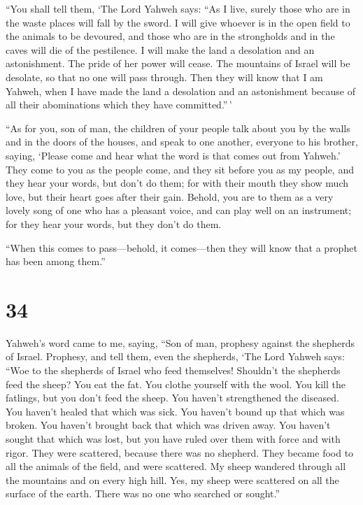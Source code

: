  ``You shall tell them, `The Lord Yahweh says: ``As I live,
surely those who are in the waste places will fall by the sword. I will
give whoever is in the open field to the animals to be devoured, and
those who are in the strongholds and in the caves will die of the
pestilence.  I will make the land a desolation and an
astonishment. The pride of her power will cease. The mountains of Israel
will be desolate, so that no one will pass through.  Then
they will know that I am Yahweh, when I have made the land a desolation
and an astonishment because of all their abominations which they have
committed.''\,'

 ``As for you, son of man, the children of your people talk
about you by the walls and in the doors of the houses, and speak to one
another, everyone to his brother, saying, `Please come and hear what the
word is that comes out from Yahweh.'  They come to you as
the people come, and they sit before you as my people, and they hear
your words, but don't do them; for with their mouth they show much love,
but their heart goes after their gain.  Behold, you are to
them as a very lovely song of one who has a pleasant voice, and can play
well on an instrument; for they hear your words, but they don't do them.

 ``When this comes to pass---behold, it comes---then they
will know that a prophet has been among them.''

\hypertarget{section-32}{%
\section{34}\label{section-32}}

 Yahweh's word came to me, saying,  ``Son of
man, prophesy against the shepherds of Israel. Prophesy, and tell them,
even the shepherds, `The Lord Yahweh says: ``Woe to the shepherds of
Israel who feed themselves! Shouldn't the shepherds feed the sheep?
 You eat the fat. You clothe yourself with the wool. You
kill the fatlings, but you don't feed the sheep.  You
haven't strengthened the diseased. You haven't healed that which was
sick. You haven't bound up that which was broken. You haven't brought
back that which was driven away. You haven't sought that which was lost,
but you have ruled over them with force and with rigor. 
They were scattered, because there was no shepherd. They became food to
all the animals of the field, and were scattered.  My sheep
wandered through all the mountains and on every high hill. Yes, my sheep
were scattered on all the surface of the earth. There was no one who
searched or sought.''

